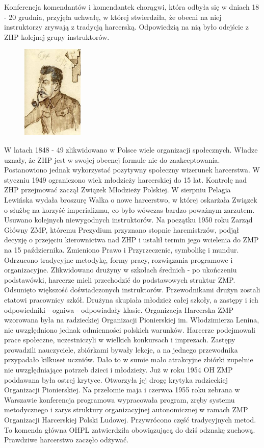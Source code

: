 Konferencja komendantów i komendantek chorągwi, która odbyła się w dniach 18 - 20 grudnia, przyjęła uchwałę, w której stwierdziła, że obecni na niej instruktorzy zrywają z tradycją harcerską. Odpowiedzią na nią było odejście z ZHP kolejnej grupy instruktorów.

\begin{figure}
  \begin{center}
    \includegraphics[width=2.9cm]{grafiki/stalin.jpg}
  \end{center}
\end{figure}
W latach 1848 - 49 zlikwidowano w Polsce wiele organizacji społecznych. Władze uznały, że ZHP jest w swojej obecnej formule nie do zaakceptowania. Postanowiono jednak wykorzystać pozytywny społeczny wizerunek harcerstwa. W styczniu 1949 ograniczono wiek młodzieży harcerskiej do 15 lat. Kontrolę nad ZHP przejmować zaczął Związek Młodzieży Polskiej. W sierpniu Pelagia Lewińska wydała broszurę Walka o nowe harcerstwo, w której oskarżała Związek o służbę na korzyść imperializmu, co było wówczas bardzo poważnym zarzutem. Usuwano kolejnych niewygodnych instruktorów. Na początku 1950 roku Zarząd Główny ZMP, któremu Prezydium przyznano stopnie harcmistrzów, podjął decyzję o przejęciu kierownictwa nad ZHP i ustalił termin jego wcielenia do ZMP na 15 października. Zmieniono Prawo i Przyrzeczenie, symbolikę i mundur. Odrzucono tradycyjne metodykę, formy pracy, rozwiązania programowe i organizacyjne. Zlikwidowano drużyny w szkołach średnich - po ukończeniu podstawówki, harcerze mieli przechodzić do podstawowych struktur ZMP. Odsunięto większość doświadczonych instruktorów. Przewodnikami drużyn zostali etatowi pracownicy szkół. Drużyna skupiała młodzież całej szkoły, a zastępy i ich odpowiedniki - ogniwa - odpowiadały klasie. Organizacja Harcerska ZMP wzorowana była na radzieckiej Organizacji Pionierskiej im. Włodzimierza Lenina, nie uwzględniono jednak odmienności polskich warunków. Harcerze podejmowali prace społeczne, uczestniczyli w wielkich konkursach i imprezach. Zastępy prowadzili nauczyciele, zbiórkami bywały lekcje, a na jednego przewodnika przypadało kilkuset uczniów. Dało to w sumie mało atrakcyjne zbiórki zupełnie nie uwzględniające potrzeb dzieci i młodzieży. Już w roku 1954 OH ZMP poddawana była ostrej krytyce. Otworzyła jej drogę krytyka radzieckiej Organizacji Pionierskiej. Na przełomie maja i czerwca 1955 roku zebrana w Warszawie konferencja programowa wypracowała program, zręby systemu metodycznego i zarys struktury organizacyjnej autonomicznej w ramach ZMP Organizacji Harcerskiej Polski Ludowej. Przywrócono część tradycyjnych metod. To komenda główna OHPL zatwierdziła obowiązującą do dziś odznakę zuchową. Prawdziwe harcerstwo zaczęło odżywać.

